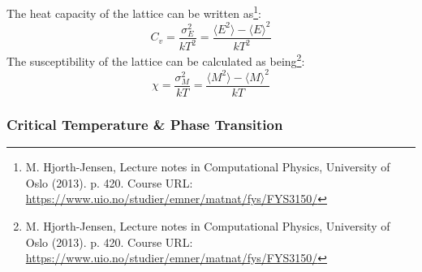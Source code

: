 \documentclass[reprint,english,notitlepage]{revtex4-1}  %
\begin{document}
The heat capacity of the lattice can be written as\footnote{M. Hjorth-Jensen, Lecture notes in Computational Physics, University of Oslo (2013). p. 420. Course URL: \url{https://www.uio.no/studier/emner/matnat/fys/FYS3150/}}:
\begin{equation}\label{eq:hctheory}
    C_v = \frac{\sigma_E^2}{kT^2} = \frac{\langle E^2 \rangle - \langle E \rangle^2}{kT^2}
\end{equation}
The susceptibility of the lattice can be calculated as being\footnote{M. Hjorth-Jensen, Lecture notes in Computational Physics, University of Oslo (2013). p. 420. Course URL: \url{https://www.uio.no/studier/emner/matnat/fys/FYS3150/}}:
\begin{equation}\label{eq:chitheory}
    \chi = \frac{\sigma_M^2}{kT} = \frac{\langle M^2 \rangle - \langle M \rangle^2}{kT}
\end{equation}

\subsubsection{Critical Temperature \& Phase Transition}
\end{document}

